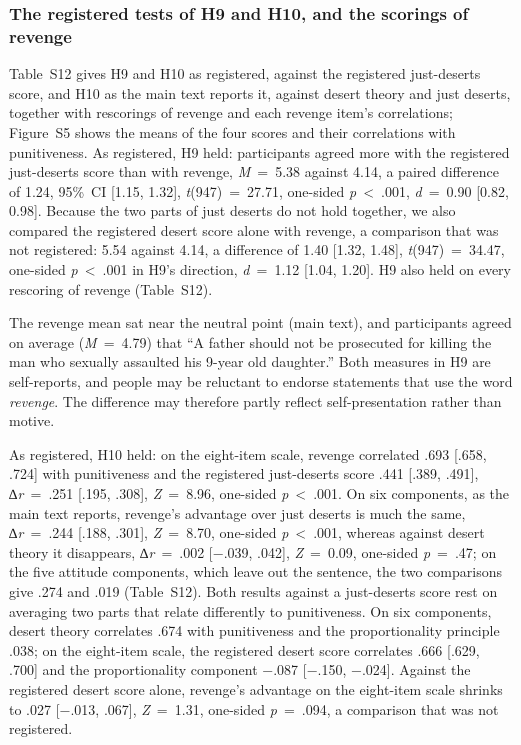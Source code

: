 \subsubsection{The registered tests of H9 and H10, and the scorings of revenge}\label{the-registered-tests-of-h9-and-h10-and-the-scorings-of-revenge}

Table~S12 gives H9 and H10 as registered, against the registered just-deserts score, and H10 as the main text reports it, against desert theory and just deserts, together with rescorings of revenge and each revenge item's correlations; Figure~S5 shows the means of the four scores and their correlations with punitiveness. As registered, H9 held: participants agreed more with the registered just-deserts score than with revenge, \emph{M}~=~5.38 against 4.14, a paired difference of 1.24, 95\%~CI {[}1.15, 1.32{]}, \emph{t}(947)~=~27.71, one-sided \emph{p}~\textless{}~.001, \emph{d}~=~0.90 {[}0.82, 0.98{]}. Because the two parts of just deserts do not hold together, we also compared the registered desert score alone with revenge, a comparison that was not registered: 5.54 against 4.14, a difference of 1.40 {[}1.32, 1.48{]}, \emph{t}(947)~=~34.47, one-sided \emph{p}~\textless{}~.001 in H9's direction, \emph{d}~=~1.12 {[}1.04, 1.20{]}. H9 also held on every rescoring of revenge (Table~S12).

The revenge mean sat near the neutral point (main text), and participants agreed on average (\emph{M}~=~4.79) that ``A father should not be prosecuted for killing the man who sexually assaulted his 9-year old daughter.'' Both measures in H9 are self-reports, and people may be reluctant to endorse statements that use the word \emph{revenge}. The difference may therefore partly reflect self-presentation rather than motive.

As registered, H10 held: on the eight-item scale, revenge correlated .693 {[}.658, .724{]} with punitiveness and the registered just-deserts score .441 {[}.389, .491{]}, ∆\emph{r}~=~.251 {[}.195, .308{]}, \emph{Z}~=~8.96, one-sided \emph{p}~\textless{}~.001. On six components, as the main text reports, revenge's advantage over just deserts is much the same, ∆\emph{r}~=~.244 {[}.188, .301{]}, \emph{Z}~=~8.70, one-sided \emph{p}~\textless{}~.001, whereas against desert theory it disappears, ∆\emph{r}~=~.002 {[}−.039, .042{]}, \emph{Z}~=~0.09, one-sided \emph{p}~=~.47; on the five attitude components, which leave out the sentence, the two comparisons give .274 and .019 (Table~S12). Both results against a just-deserts score rest on averaging two parts that relate differently to punitiveness. On six components, desert theory correlates .674 with punitiveness and the proportionality principle .038; on the eight-item scale, the registered desert score correlates .666 {[}.629, .700{]} and the proportionality component −.087 {[}−.150, −.024{]}. Against the registered desert score alone, revenge's advantage on the eight-item scale shrinks to .027 {[}−.013, .067{]}, \emph{Z}~=~1.31, one-sided \emph{p}~=~.094, a comparison that was not registered.

